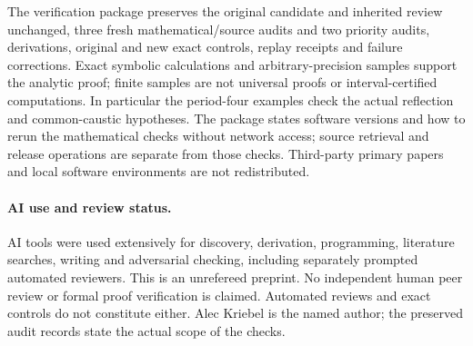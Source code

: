 \documentclass[11pt]{article}
\begin{document}
The verification package preserves the original candidate and inherited
review unchanged, three fresh mathematical/source audits and two priority
audits, derivations, original and new exact controls, replay receipts and
failure corrections. Exact symbolic calculations and arbitrary-precision
samples support the analytic proof; finite samples are not universal proofs
or interval-certified computations. In particular the period-four examples
check the actual reflection and common-caustic hypotheses. The package
states software versions and how to rerun the mathematical checks without
network access; source retrieval and release operations are separate from
those checks. Third-party primary papers and local software environments
are not redistributed.

\paragraph{AI use and review status.}
AI tools were used extensively for discovery, derivation, programming,
literature searches, writing and adversarial checking, including separately
prompted automated reviewers. This is an unrefereed preprint. No independent
human peer review or formal proof verification is claimed. Automated reviews
and exact controls do not constitute either. Alec Kriebel is the named author;
the preserved audit records state the actual scope of the checks.
\end{document}
